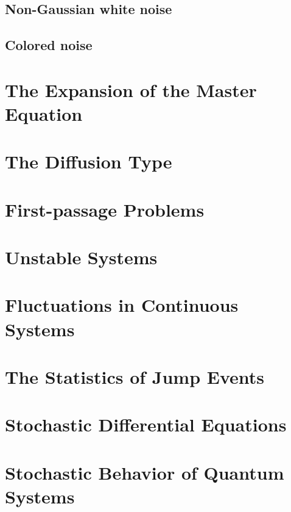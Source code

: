 \documentclass{book}
\numberwithin{equation}{section}
\theoremstyle{plain}
\theoremstyle{definition}
\theoremstyle{remark}
\begin{document}
\section{Non-Gaussian white noise}

\section{Colored noise}

\chapter{The Expansion of the Master Equation}

\chapter{The Diffusion Type}

\chapter{First-passage Problems}

\chapter{Unstable Systems}

\chapter{Fluctuations in Continuous Systems}

\chapter{The Statistics of Jump Events}

\chapter{Stochastic Differential Equations}

\chapter{Stochastic Behavior of Quantum Systems}



\end{document}
